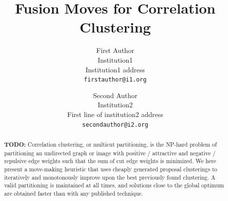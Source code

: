 \documentclass[10pt,twocolumn,letterpaper]{article}
\begin{document}

\title{Fusion Moves for Correlation Clustering}

\author{First Author\\
Institution1\\
Institution1 address\\
{\tt\small firstauthor@i1.org}
\and
Second Author\\
Institution2\\
First line of institution2 address\\
{\tt\small secondauthor@i2.org}
}

\maketitle


\begin{abstract}
  \color{red} \textbf{TODO:}
Correlation clustering, or multicut partitioning, is the NP-hard problem of partitioning an undirected graph or image with positive / attractive and negative / repulsive edge weights such that the sum of cut edge weights is minimized. We here present a move-making heuristic that uses cheaply generated proposal clusterings to iteratively and monotonously improve upon the best previously found clustering. A valid partitioning is maintained at all times, and solutions close to the global optimum are obtained faster than with any published technique. 
    

\end{abstract}
\end{document}
